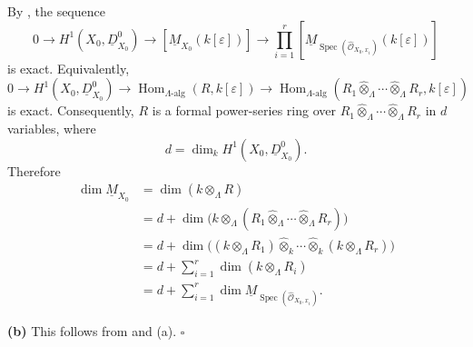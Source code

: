By , the sequence
\[
0\longrightarrow H^1(X_0,\underline D^0_{X_0})
\longrightarrow[\underline M_{X_0}(k[\varepsilon])]
\longrightarrow
\prod_{i=1}^r
[\underline M_{\operatorname{Spec}(\widehat{\mathcal O}_{X_0,x_i})}
  (k[\varepsilon])]
\]
is exact. Equivalently,
\[
0\longrightarrow H^1(X_0,\underline D^0_{X_0})
\longrightarrow\operatorname{Hom}_{\Lambda\text{-alg}}(R,k[\varepsilon])
\longrightarrow
\operatorname{Hom}_{\Lambda\text{-alg}}
 (R_1\widehat\otimes_\Lambda\cdots\widehat\otimes_\Lambda R_r,
  k[\varepsilon])
\]
is exact. Consequently, $R$ is a formal power-series ring over
$R_1\widehat\otimes_\Lambda\cdots\widehat\otimes_\Lambda R_r$ in
$d$ variables, where
\[
d=\dim_k H^1(X_0,\underline D^0_{X_0}).
\]
Therefore
\begin{align*}
\dim\underline M_{X_0}
 &=\dim(k\otimes_\Lambda R) \\
 &=d+\dim\bigl(k\otimes_\Lambda
   (R_1\widehat\otimes_\Lambda\cdots\widehat\otimes_\Lambda R_r)
   \bigr) \\
 &=d+\dim\bigl((k\otimes_\Lambda R_1)
   \widehat\otimes_k\cdots\widehat\otimes_k
   (k\otimes_\Lambda R_r)\bigr) \\
 &=d+\sum_{i=1}^r\dim(k\otimes_\Lambda R_i) \\
 &=d+\sum_{i=1}^r
   \dim\underline M_{\operatorname{Spec}
   (\widehat{\mathcal O}_{X_0,x_i})}.
\end{align*}


\noindent\textbf{(b)} This follows from  and (a).
\hfill$\square$

